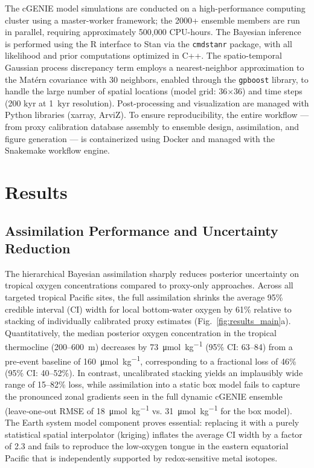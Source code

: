 \documentclass{article}
\begin{document}
The cGENIE model simulations are conducted on a high-performance computing cluster using a master-worker framework; the 2000+ ensemble members are run in parallel, requiring approximately 500,000 CPU-hours.
The Bayesian inference is performed using the R interface to Stan via the \texttt{cmdstanr} package, with all likelihood and prior computations optimized in C++.
The spatio-temporal Gaussian process discrepancy term employs a nearest-neighbor approximation to the Matérn covariance with 30 neighbors, enabled through the \texttt{gpboost} library, to handle the large number of spatial locations (model grid: 36$\times$36) and time steps (200 kyr at 1~kyr resolution).
Post-processing and visualization are managed with Python libraries (xarray, ArviZ).
To ensure reproducibility, the entire workflow — from proxy calibration database assembly to ensemble design, assimilation, and figure generation — is containerized using Docker and managed with the Snakemake workflow engine.

\section{Results}

\subsection{Assimilation Performance and Uncertainty Reduction}

The hierarchical Bayesian assimilation sharply reduces posterior uncertainty on tropical oxygen concentrations compared to proxy-only approaches.  
Across all targeted tropical Pacific sites, the full assimilation shrinks the average 95\% credible interval (CI) width for local bottom‑water oxygen by 61\% relative to stacking of individually calibrated proxy estimates (Fig.~\ref{fig:results_main}a).  
Quantitatively, the median posterior oxygen concentration in the tropical thermocline (200–600~m) decreases by \SI{73}{\micro\mol\per\kg} (95\% CI: 63–84) from a pre‑event baseline of \SI{160}{\micro\mol\per\kg}, corresponding to a fractional loss of 46\% (95\% CI: 40–52\%).  
In contrast, uncalibrated stacking yields an implausibly wide range of 15–82\% loss, while assimilation into a static box model fails to capture the pronounced zonal gradients seen in the full dynamic cGENIE ensemble (leave‑one‑out RMSE of \SI{18}{\micro\mol\per\kg} vs. \SI{31}{\micro\mol\per\kg} for the box model).  
The Earth system model component proves essential: replacing it with a purely statistical spatial interpolator (kriging) inflates the average CI width by a factor of 2.3 and fails to reproduce the low‑oxygen tongue in the eastern equatorial Pacific that is independently supported by redox‑sensitive metal isotopes.
\end{document}
